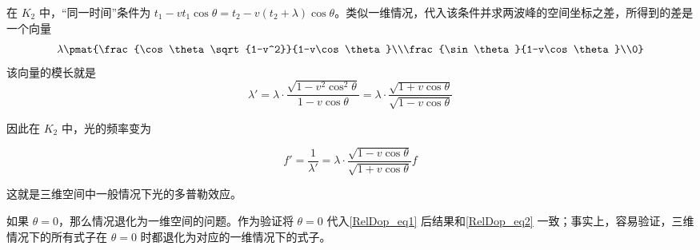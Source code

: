 在 $K_2$ 中，“同一时间”条件为 $t_1-vt_1\cos{\theta}=t_2-v(t_2+\lambda)\cos{\theta}$。类似一维情况，代入该条件并求两波峰的空间坐标之差，所得到的差是一个向量
\begin{equation}
\lambda\pmat{\frac{\cos\theta\sqrt{1-v^2}}{1-v\cos\theta}\\\frac{\sin\theta}{1-v\cos\theta}\\0}
\end{equation}
该向量的模长就是
\begin{equation}
\lambda'=\lambda\cdot\frac{\sqrt{1-v^2\cos^2\theta}}{1-v\cos\theta} = \lambda\cdot\frac{\sqrt{1+v\cos\theta}}{\sqrt{1-v\cos\theta}}
\end{equation}

因此在 $K_2$ 中，光的频率变为

\begin{equation}\label{RelDop_eq1}
f'=\frac{1}{\lambda'}=\lambda\cdot\frac{\sqrt{1-v\cos\theta}}{\sqrt{1+v\cos\theta}}f
\end{equation}

这就是三维空间中一般情况下光的多普勒效应。

如果 $\theta=0$，那么情况退化为一维空间的问题。作为验证将 $\theta=0$ 代入\autoref{RelDop_eq1} 后结果和\autoref{RelDop_eq2} 一致；事实上，容易验证，三维情况下的所有式子在 $\theta=0$ 时都退化为对应的一维情况下的式子。
